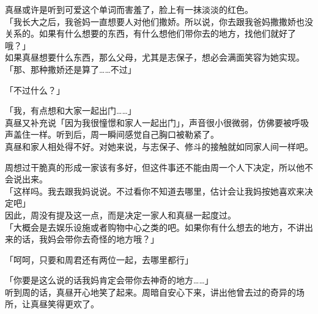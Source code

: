 真昼或许是听到可爱这个单词而害羞了，脸上有一抹淡淡的红色。\\

「我长大之后，我爸妈一直想要人对他们撒娇。所以说，你去跟我爸妈撒撒娇也没关系的。如果有什么想要的东西，有什么想他们带你去的地方，找他们就好了哦？」\\

如果真昼想要什么东西，那么父母，尤其是志保子，想必会满面笑容为她实现。\\

「那、那种撒娇还是算了……不过」

「不过什么？」

「我，有点想和大家一起出门……」\\

真昼又补充说「因为我很憧憬和家人一起出门」，声音很小很微弱，仿佛要被呼吸声盖住一样。听到后，周一瞬间感觉自己胸口被勒紧了。\\

真昼和家人相处得不好。对她来说，与志保子、修斗的接触就如同家人间一样吧。

周想过干脆真的形成一家该有多好，但这件事还不能由周一个人下决定，所以他不会说出来。\\

「这样吗。我去跟我妈说说。不过看你不知道去哪里，估计会让我妈按她喜欢来决定吧」\\

因此，周没有提及这一点，而是决定一家人和真昼一起度过。\\

「大概会是去娱乐设施或者购物中心之类的吧。如果你有什么想去的地方，不讲出来的话，我妈会带你去奇怪的地方哦？」

「呵呵，只要和周君还有两位一起，去哪里都行」

「你要是这么说的话我妈肯定会带你去神奇的地方……」\\

听到周的话，真昼开心地笑了起来。周暗自安心下来，讲出他曾去过的奇异的场所，让真昼笑得更欢了。
